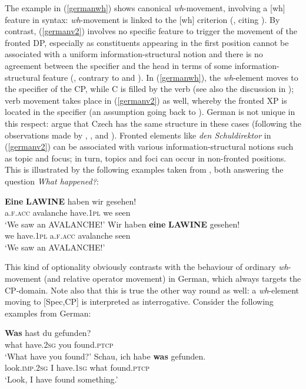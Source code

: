 The example in (\ref{germanwh}) shows canonical \textit{wh}-movement, involving a [wh] feature in syntax: \textit{wh}-movement is linked to the [wh] criterion (\citealt[172]{fanselowlenertova2011}, citing \citealt{rizzi1991}). By contrast, (\ref{germanv2}) involves no specific feature to trigger the movement of the fronted DP, especially as constituents appearing in the first position cannot be associated with a uniform information-structural notion and there is no agreement between the specifier and the head in terms of some information-structural feature (\citealt[172]{fanselowlenertova2011}, contrary to \citealt{grewendorf1980} and \citealt{rizzi1997}). In (\ref{germanwh}), the \textit{wh}-element moves to the specifier of the CP, while C is filled by the verb (see also the discussion in ); verb movement takes place in (\ref{germanv2}) as well, whereby the fronted XP is located in the specifier (an assumption going back to \citealt{thiersch1978diss}). German is not unique in this respect: \citet{fanselowlenertova2011} argue that Czech has the same structure in these cases (following the observations made by \citealt{toman1999}, \citealt{lenertova2004}, and \citealt{meyer2004}). Fronted elements like \textit{den Schuldirektor} in (\ref{germanv2}) can be associated with various information-structural notions such as topic and focus; in turn, topics and foci can occur in non-fronted positions. This is illustrated by the following examples taken from \citet[172, ex. 6c and 6d]{fanselowlenertova2011}, both answering the question \textit{What happened?}:

\ea
\ea \gll \textbf{Eine} \textbf{LAWINE} haben wir gesehen!\\
a.\textsc{f.acc} avalanche have.\textsc{1pl} we seen\\
\glt `We saw an AVALANCHE!'
\ex \gll Wir haben \textbf{eine} \textbf{LAWINE} gesehen!\\
we have.\textsc{1pl} a.\textsc{f.acc} avalanche seen\\
\glt `We saw an AVALANCHE!'
\z
\z

This kind of optionality obviously contrasts with the behaviour of ordinary \textit{wh}-movement (and relative operator movement) in German, which always targets the CP-domain. Note also that this is true the other way round as well: a \textit{wh}-element moving to [Spec,CP] is interpreted as interrogative. Consider the following examples from German:

\ea
\ea \gll \textbf{Was} hast du gefunden? \label{wasfronted}\\
what have.\textsc{2sg} you found.\textsc{ptcp}\\
\glt `What have you found?'
\ex \gll Schau, ich habe \textbf{was} gefunden. \label{wasbase}\\
look.\textsc{imp.2sg} I have.\textsc{1sg} what found.\textsc{ptcp}\\
\glt `Look, I have found something.'
\z
\z

